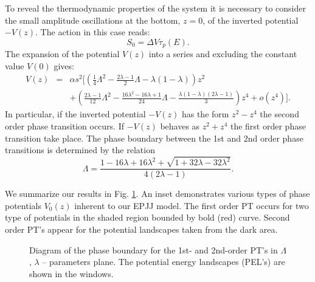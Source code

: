 \documentclass[fleqn,10pt]{wlscirep}
\begin{document}
To reveal the thermodynamic properties of the system it is necessary to consider the small amplitude oscillations at the bottom, $z=0$, of the inverted potential $-V(z)$.
The action in this case reads: 
%
\begin{equation}
S_0 = \Delta V \tau_p (E).
\label{eq:thermal_action}
\end{equation}
%
The expansion of the potential $V(z)$ into a series and excluding the constant value $V(0)$ gives:
%
\begin{equation}
\begin{array}{lcl}
V(z) & = & \alpha s^2 \Big[ \left( \frac{1}{4} \Lambda^2  - \frac{2\lambda - 1}{2} \Lambda - \lambda (1 - \lambda) \right) z^2 \\
&& + \left( \frac{2\lambda - 1}{12} \Lambda^2 - \frac{16\lambda^2 - 16\lambda + 1}{24} \Lambda - \frac{\lambda (1 - \lambda) (2\lambda - 1)}{3} \right) z^4 + o(z^4) \Big].
\end{array}
\label{eq:potential_teylor}
\end{equation}
%
In particular, if the inverted potential $-V(z)$ has the form $z^2 - z^4$ the second order phase transition occurs.
If $-V(z)$ behaves as $z^2 + z^4$ the first order phase transition take place.
The phase boundary between the 1st and 2nd order phase transitions is determined by the relation
%
\begin{equation}
\Lambda = \frac{1 - 16\lambda + 16\lambda^2 + \sqrt{1 + 32\lambda - 32\lambda^2}}{4(2\lambda - 1)}.
\label{eq:order_border}
\end{equation}
%

We summarize our results in Fig. \ref{pic:phase_boundary_combined}. An inset demonstrates various types of  phase potentials $V_0(z)$ inherent to our EPJJ model. The first order PT occurs for two type of potentials in the shaded region bounded by bold  (red) curve.  Second order PT's appear for the potential landscapes taken from the dark area. 
%
\begin{figure}[ht]
\caption{Diagram of the phase boundary for the 1st- and 2nd-order PT's in $\Lambda$, $\lambda$ -- parameters plane.
The potential energy landscapes (PEL's) are shown in the windows. \label{pic:phase_boundary_combined}}
\end{figure}
%
\end{document}
